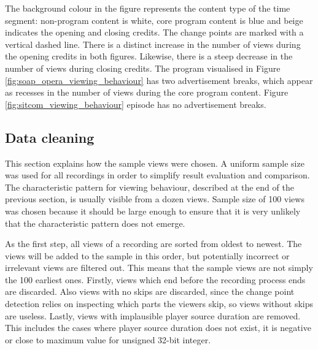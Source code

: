 The background colour in the figure represents the content type of the time segment: non-program content is white, core program content is blue and beige indicates the opening and closing credits. The change points are marked with a vertical dashed line. There is a distinct increase in the number of views during the opening credits in both figures. Likewise, there is a steep decrease in the number of views during closing credits. The program visualised in Figure \ref{fig:soap_opera_viewing_behaviour} has two advertisement breaks, which appear as recesses in the number of views during the core program content. Figure \ref{fig:sitcom_viewing_behaviour} episode has no advertisement breaks.

\subsection{Data cleaning} \label{subsec:cleaning} %


This section explains how the sample views were chosen. A uniform sample size was used for all recordings in order to simplify result evaluation and comparison. The characteristic pattern for viewing behaviour, described at the end of the previous section, is usually visible from a dozen views. Sample size of 100 views was chosen because it should be large enough to ensure that it is very unlikely that the characteristic pattern does not emerge.

As the first step, all views of a recording are sorted from oldest to newest. The views will be added to the sample in this order, but potentially incorrect or irrelevant views are filtered out. This means that the sample views are not simply the 100 earliest ones. Firstly, views which end before the recording process ends are discarded. Also views with no skips are discarded, since the change point detection relies on inspecting which parts the viewers skip, so views without skips are useless. Lastly, views with implausible player source duration are removed. This includes the cases where player source duration does not exist, it is negative or close to maximum value for unsigned 32-bit integer.

